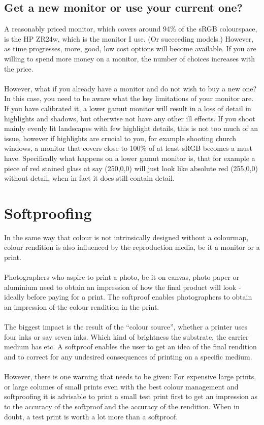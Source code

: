 \subsection{Get a new monitor or use your current one?}

A reasonably priced monitor, which covers around 94\% of the sRGB \gls{colourspace}, is the HP ZR24w, which is the monitor I use. (Or succeeding models.) However, as time progresses, more, good, low cost options will become available. If you are willing to spend more money on a monitor, the number of choices increases with the price.
\\
\\
However, what if you already have a monitor and do not wish to buy a new one?
\\
In this case, you need to be aware what the key limitations of your monitor are. If you have calibrated it, a lower gamut monitor will result in a loss of detail in highlights and shadows, but otherwise not have any other ill effects. If you shoot mainly evenly lit landscapes with few highlight details, this is not too much of an issue, however if highlights are crucial to you, for example shooting church windows, a monitor that covers close to 100\% of at least sRGB becomes a must have. Specifically what happens on a lower gamut monitor is, that for example a piece of red stained glass at say (250,0,0) will just look like absolute red (255,0,0) without detail, when in fact it does still contain detail.


\section{Softproofing}

In the same way that colour is not intrinsically designed without a colourmap, colour rendition is also influenced by the reproduction media, be it a monitor or a print.
\\
\\
Photographers who aspire to print a photo, be it on canvas, photo paper or aluminium need to obtain an impression of how the final product will look - ideally before paying for a print. The softproof enables photographers to obtain an impression of the colour rendition in the print.
\\
\\
The biggest impact is the result of the ``colour source'', whether a printer uses four inks or say seven inks. Which kind of brightness the substrate, the carrier medium has etc.
A softproof enables the user to get an idea of the final rendition and to correct for any undesired consequences of printing on a specific medium.
\\
\\
However, there is one warning that needs to be given: For expensive large prints, or large columes of small prints even with the best colour management and softproofing it is advisable to print a small test print first to get an impression as to the accuracy of the softproof and the accuracy of the rendition.
When in doubt, a test print is worth a lot more than a softproof.



